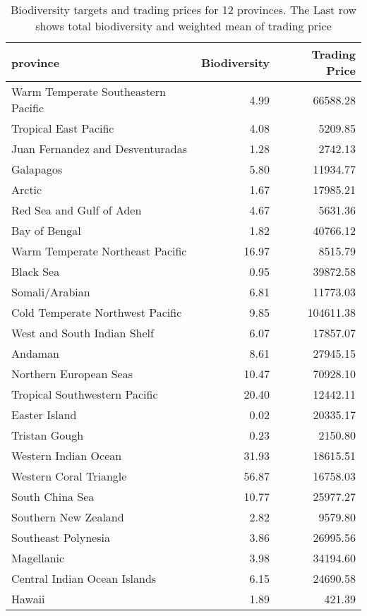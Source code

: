 \begin{table}

\caption{\label{tab:pro-trading-prices}Biodiversity targets and trading prices for 12 provinces. The Last row shows total biodiversity and weighted mean of trading price}
\centering
\begin{tabular}[t]{l|r|r}
\hline
province & Biodiversity & Trading Price\\
\hline
Warm Temperate Southeastern Pacific & 4.99 & 66588.28\\
\hline
Tropical East Pacific & 4.08 & 5209.85\\
\hline
Juan Fernandez and Desventuradas & 1.28 & 2742.13\\
\hline
Galapagos & 5.80 & 11934.77\\
\hline
Arctic & 1.67 & 17985.21\\
\hline
Red Sea and Gulf of Aden & 4.67 & 5631.36\\
\hline
Bay of Bengal & 1.82 & 40766.12\\
\hline
Warm Temperate Northeast Pacific & 16.97 & 8515.79\\
\hline
Black Sea & 0.95 & 39872.58\\
\hline
Somali/Arabian & 6.81 & 11773.03\\
\hline
Cold Temperate Northwest Pacific & 9.85 & 104611.38\\
\hline
West and South Indian Shelf & 6.07 & 17857.07\\
\hline
Andaman & 8.61 & 27945.15\\
\hline
Northern European Seas & 10.47 & 70928.10\\
\hline
Tropical Southwestern Pacific & 20.40 & 12442.11\\
\hline
Easter Island & 0.02 & 20335.17\\
\hline
Tristan Gough & 0.23 & 2150.80\\
\hline
Western Indian Ocean & 31.93 & 18615.51\\
\hline
Western Coral Triangle & 56.87 & 16758.03\\
\hline
South China Sea & 10.77 & 25977.27\\
\hline
Southern New Zealand & 2.82 & 9579.80\\
\hline
Southeast Polynesia & 3.86 & 26995.56\\
\hline
Magellanic & 3.98 & 34194.60\\
\hline
Central Indian Ocean Islands & 6.15 & 24690.58\\
\hline
Hawaii & 1.89 & 421.39\\

\end{tabular}
\end{table}
